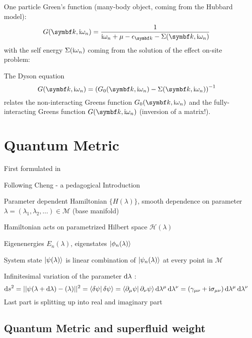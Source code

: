 \documentclass[../notes.tex]{subfiles}
\begin{document}
One particle Green's function (many-body object, coming from the Hubbard model):
\begin{equation}
	G(\vb{k}, \iu \omega_n) = \frac{1}{\iu \omega_n + \mu - \epsilon_{\vb{k}} - \Sigma(\vb{k}, \iu \omega_n)}
\end{equation}
with the self energy \(\Sigma(\mathrm{i} \omega_n)\) coming from the solution of the effect on-site problem:

The Dyson equation
\begin{equation}
	G(\vb{k}, \iu \omega_n) = \left( G_0 (\vb{k}, \iu \omega_n) - \Sigma(\vb{k}, \iu \omega_n)\right)^{-1}
\end{equation}
relates the non-interacting Greens function \(G_0 (\vb{k}, \iu \omega_n)\) and the fully-interacting Greens function \(G (\vb{k}, \iu \omega_n)\) (inversion of a matrix!).

\section{Quantum Metric}\label{sec:quantum-metric}

First formulated in \cite{provostRiemannianStructureManifolds1980}

Following Cheng - a pedagogical Introduction 

Parameter dependent Hamiltonian \(\{H(\lambda)\}\), smooth dependence on parameter \(\lambda = (\lambda_1, \lambda_2, \ldots) \in \mathcal{M}\) (base manifold)

Hamiltonian acts on parametrized Hilbert space \(\mathcal{H} (\lambda)\)

Eigenenergies \(E_n (\lambda)\), eigenstates \(\ket{\phi_n (\lambda)}\)

System state \(\ket{\psi (\lambda)}\) is linear combination of \(\ket{\psi_n (\lambda)}\) at every point in \(\mathcal{M}\)

Infinitesimal variation of the parameter \(\odif{\lambda}\) :
\begin{equation}
	\odif{s^2} = \vert\vert \psi (\lambda + \odif{\lambda}) - \si (\lambda) \vert \vert^2 = \braket{\fdif{\psi} | \fdif{\psi}} = \braket{\pdif{\mu} \psi | \pdif{\nu} \psi} \odif{\lambda^{\mu}} \odif{\lambda^{\nu}} = (\gamma_{\mu \nu} + \iu \sigma_{\mu \nu}) \odif{\lambda^{\mu}} \odif{\lambda^{\nu}}
\end{equation}
Last part is splitting up into real and imaginary part

\subsection*{Quantum Metric and superfluid weight}


\cite{peottaSuperfluidityTopologicallyNontrivial2015}
\end{document}
